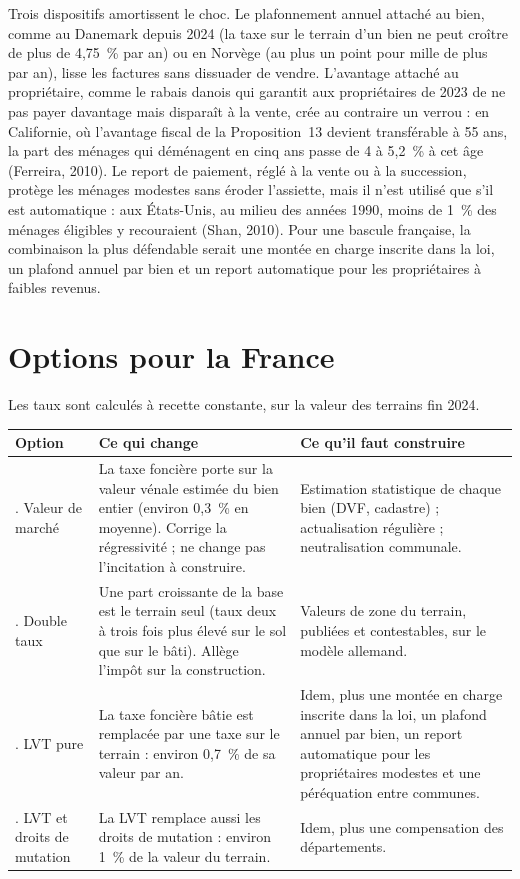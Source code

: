 \documentclass[11pt,a4paper]{article}
\begin{document}
Trois dispositifs amortissent le choc. Le plafonnement annuel
attaché au bien, comme au Danemark depuis 2024 (la taxe sur le terrain d'un bien ne peut croître
de plus de 4,75~\% par an) ou en Norvège (au plus un point pour mille de plus par an), lisse les
factures sans dissuader de vendre. L'avantage attaché au propriétaire, comme le rabais danois qui
garantit aux propriétaires de 2023 de ne pas payer davantage mais disparaît à la vente, crée au
contraire un verrou : en Californie, où l'avantage fiscal de la Proposition~13 devient
transférable à 55 ans, la part des ménages qui déménagent en cinq ans passe de 4 à 5,2~\% à cet âge
(Ferreira, 2010). Le report de paiement, réglé
à la vente ou à la succession, protège les ménages modestes sans éroder l'assiette, mais il n'est
utilisé que s'il est automatique : aux États-Unis, au milieu des années 1990, moins de 1~\% des ménages
éligibles y recouraient (Shan, 2010). Pour une bascule française, la combinaison la plus défendable serait une montée en
charge inscrite dans la loi, un plafond annuel par bien et un report automatique pour les
propriétaires à faibles revenus.


\clearpage
\section{Options pour la France}

Les taux sont calculés à recette constante, sur la valeur des terrains fin 2024.

\begin{center}\small
\begin{tabularx}{\linewidth}{@{}>{\raggedright\arraybackslash}p{3.1cm}>{\raggedright\arraybackslash}X>{\raggedright\arraybackslash}p{4.3cm}@{}}
\toprule
Option & Ce qui change & Ce qu'il faut construire \\
\midrule
1. Valeur de marché & La taxe foncière porte sur la valeur vénale estimée du bien entier
(environ 0,3~\% en moyenne). Corrige la régressivité ; ne change pas l'incitation à construire. &
Estimation statistique de chaque bien (DVF, cadastre) ; actualisation régulière ; neutralisation
communale. \\[3pt]
2. Double taux & Une part croissante de la base est le terrain seul (taux deux à trois fois plus
élevé sur le sol que sur le bâti). Allège l'impôt sur la construction. & Valeurs de zone du
terrain, publiées et contestables, sur le modèle allemand. \\[3pt]
3. LVT pure & La taxe foncière bâtie est remplacée par une taxe sur le terrain : environ 0,7~\% de
sa valeur par an. & Idem, plus une montée en charge inscrite dans la loi, un plafond annuel par bien,
un report automatique pour les propriétaires modestes et une péréquation entre communes. \\[3pt]
4. LVT et droits de mutation & La LVT remplace aussi les droits de mutation : environ 1~\% de la
valeur du terrain. & Idem, plus une compensation des départements. \\
\bottomrule
\end{tabularx}
\end{center}
\end{document}
